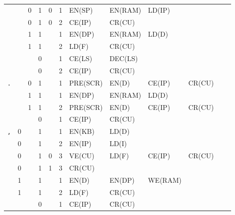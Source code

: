 \begin{longtable}[c] {c|cccc|c|llllll}
    \rowcolor{Gray}               &   & 0 & 1     & 0    & 1     & EN(SP)   & EN(RAM)  & LD(IP)  &        &        &        \\
    \rowcolor{Gray}               &   & 0 & 1     & 0    & 2     & CE(IP)   & CR(CU)   &         &        &        &        \\
    \rowcolor{White}              &   & 1 & 1     &      & 1     & EN(DP)   & EN(RAM)  & LD(D)   &        &        &        \\
    \rowcolor{White}              &   & 1 & 1     &      & 2     & LD(F)    & CR(CU)   &         &        &        &        \\
    \rowcolor{Gray}               &   &   & 0     &      & 1     & CE(LS)   & DEC(LS)  &         &        &        &        \\ 
    \rowcolor{Gray}               &   &   & 0     &      & 2     & CE(IP)   & CR(CU)   &         &        &        &        \\ \hline
    
    \rowcolor{Gray}  \texttt{.}   &   & 0 & 1     &      & 1     & PRE(SCR) & EN(D)    & CE(IP)  & CR(CU) &        &        \\
    \rowcolor{White}              &   & 1 & 1     &      & 1     & EN(DP)   & EN(RAM)  & LD(D)   &        &        &        \\
    \rowcolor{White}              &   & 1 & 1     &      & 2     & PRE(SCR) & EN(D)    & CE(IP)  & CR(CU) &        &        \\
    \rowcolor{Gray}               &   &   & 0     &      & 1     & CE(IP)   & CR(CU)   &         &        &        &        \\ \hline
    
    \rowcolor{White} \texttt{,}   & 0 &   & 1     &      & 1     & EN(KB)   & LD(D)    &         &        &        &        \\
    \rowcolor{White}              & 0 &   & 1     &      & 2     & EN(IP)   & LD(I)    &         &        &        &        \\
    \rowcolor{Gray}               & 0 &   & 1     & 0    & 3     & VE(CU)   & LD(F)    & CE(IP)  & CR(CU) &        &        \\
    \rowcolor{White}              & 0 &   & 1     & 1    & 3     & CR(CU)   &          &         &        &        &        \\   
    \rowcolor{Gray}               & 1 &   & 1     &      & 1     & EN(D)    & EN(DP)   & WE(RAM) &        &        &        \\
    \rowcolor{Gray}               & 1 &   & 1     &      & 2     & LD(F)    & CR(CU)   &         &        &        &        \\
    \rowcolor{White}              &   &   & 0     &      & 1     & CE(IP)   & CR(CU)   &         &        &        &        \\ \hline
    

\end{longtable}
